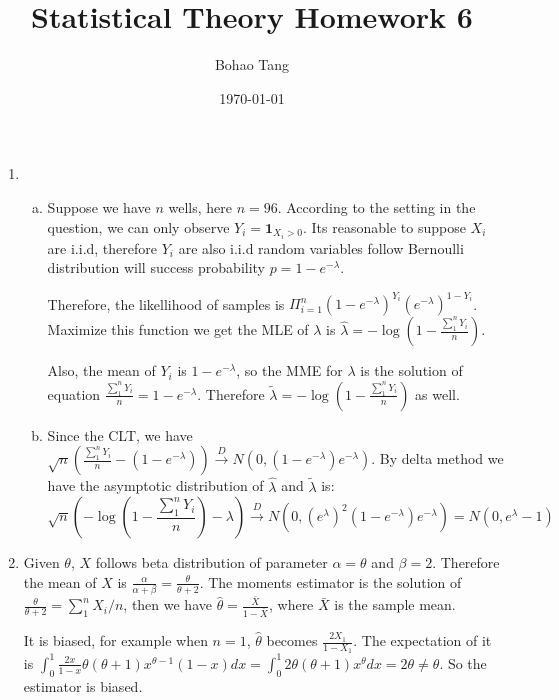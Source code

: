 \documentclass[12pt]{article}
\title{Statistical Theory Homework 6}
\date{\today}
\author{Bohao Tang}
\newcommand{\cd}{\overset{D}{\to}}
\begin{document}

\maketitle

\begin{enumerate}
    \item 
    \begin{enumerate}[(a)]
        \item
        Suppose we have $n$ wells, here $n=96$. According to the setting in the question, 
        we can only observe $Y_i = \bm{1}_{X_i > 0}$. Its reasonable to suppose $X_i$ are i.i.d, 
        therefore $Y_i$ are also i.i.d random variables follow Bernoulli distribution will success probability $p = 1 - e^{-\lambda}$.

        Therefore, the likellihood of samples is $\Pi_{i=1}^n (1 - e^{-\lambda})^{Y_i} (e^{-\lambda})^{1 - Y_i}$.
        Maximize this function we get the MLE of $\lambda$ is $\hat{\lambda} = - \log(1 - \frac{\sum_1^n Y_i}{n})$.

        Also, the mean of $Y_i$ is $1 - e^{-\lambda}$, so the MME for $\lambda$ is the solution of equation $\frac{\sum_1^n Y_i}{n} = 1 - e^{-\lambda}$.
        Therefore $\tilde{\lambda} = - \log(1 - \frac{\sum_1^n Y_i}{n})$ as well.

        \item
        Since the CLT, we have $\sqrt{n} (\frac{\sum_1^n Y_i}{n} - (1 - e^{-\lambda})) \cd N(0, (1 - e^{-\lambda})e^{-\lambda})$.
        By delta method we have the asymptotic distribution of $\hat{\lambda}$ and $\tilde{\lambda}$ is:
        $$ \sqrt{n} (- \log(1 - \frac{\sum_1^n Y_i}{n}) - \lambda) \cd N(0, (e^\lambda)^2 (1 - e^{-\lambda})e^{-\lambda}) = N(0, e^\lambda - 1) $$
    \end{enumerate}

    \item
    Given $\theta$, $X$ follows beta distribution of parameter $\alpha = \theta$ and $\beta = 2$. 
    Therefore the mean of $X$ is $\frac{\alpha}{\alpha + \beta} = \frac{\theta}{\theta + 2}$. 
    The moments estimator is the solution of $\frac{\theta}{\theta + 2} = \sum_1^n X_i / n$, then we have $\hat{\theta} = \frac{\bar{X}}{1 - \bar{X}}$, where $\bar{X}$ is the sample mean.

    It is biased, for example when $n = 1$, $\hat{\theta}$ becomes $\frac{2 X_1}{1 - X_1}$. The expectation of it is $\int_0^1 \frac{2x}{1-x} \theta(\theta + 1) x^{\theta - 1}(1-x) d x = \int_0^1 2 \theta(\theta + 1) x^{\theta} d x = 2 \theta \ne \theta$. 
    So the estimator is biased.


\end{enumerate}
\end{document}
